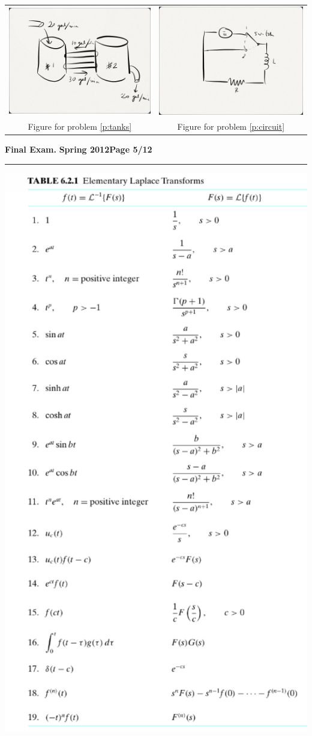 \documentclass[12pt]{article}
\begin{document}
\begin{center}
\begin{tabular}{cc}
\includegraphics[width=0.4\linewidth]{tanks} &
\includegraphics[width=0.4\linewidth]{circuit} \\
Figure for problem \ref{p:tanks} & Figure for problem \ref{p:circuit}
\end{tabular}
\end{center}
\newpage

\hfill{\large\bf Final Exam.}\hfill{\large\bf
  Spring 2012}\hfill{\large\bf Page 5/12}\hrule

\bigskip
\begin{center}\label{laplace}
\includegraphics[width=0.7\linewidth]{table}
\end{center}
\end{document}
